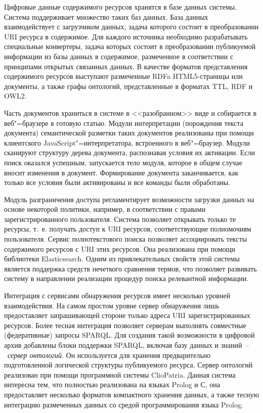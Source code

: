 \documentclass[a4paper,12pt,openany,final]{extreport}
\begin{document}
Цифровые данные содержимого ресурсов хранятся в базе данных системы.  Система поддерживает множество таких баз данных. База данных взаимодействует с загрузчиком данных, задача которого состоит в преобразовании URI ресурса в содержимое. Для каждого источника необходимо разрабатывать специальные конвертеры, задача которых состоит в преобразовании публикуемой информации из базы данных в содержимое, размеченное в соответствии с принципами открытых связанных данных. В качестве форматов представления содержимого ресурсов выступают размеченные RDFa HTML5-страницы или документы, а также графы онтологий, представленные в форматах TTL, RDF и OWL2.

Часть документов храниться в системе в <<разобранном>> виде и собирается в веб"=браузере в готовую статью. Модули интерпретации (порождения текста документа) семантической разметки таких документов реализованы при помощи клиентского JavaScript"=интерпретатора, встроенного в веб"=браузер.  Модули сканируют структуру дерева документа, распознавая условия их активации. Если поиск оказался успешным, запускается тело модуля, которое в общем случае вносит изменения в документ. Формирование документа заканчивается, как только все условия были активированы и все команды были обработаны.

Модуль разграничения доступа регламентирует возможности загрузки данных на основе некоторой политики, например, в соответствии с правами зарегистрированного пользователя. Система позволяет открывать только те ресурсы, т.~е. получать доступ к URI ресурсов, соответствующие полномочиям пользователя. Сервис полнотекстового поиска позволяет ассоциировать тексты содержимого ресурсов с URI этих ресурсов. Она реализована при помощи библиотеки Elasticsearch. Одним из привлекательных свойств этой системы является поддержка средств нечеткого сравнения термов, что позволяет развивать систему в направлении реализации процедур поиска релевантной информации.

Интеграция с сервисами обнаружения ресурсов имеет несколько уровней взаимодействия. На самом простом уровне сервер обнаружения лишь предоставляет запрашивающей стороне только адреса URI зарегистрированных ресурсов. Более тесная интеграция позволяет серверам выполнять совместные (федеративные) запросы SPARQL. Для создания такой возможности в цифровой архив добавлены блоки поддержки SPARQL, включая базу данных и знаний~--~\emph{сервер онтологий}. Он используется для хранения предварительно подготовленной логической структуры публикуемого ресурса.  Сервер онтологий реализован при помощи программной системы ClioPatria.  Данная система интересна тем, что полностью реализована на языках Prolog и С, она предоставляет несколько форматов компактного хранения данных, а также тесную интеграцию размеченных данных со средой программирования языка Prolog.
\end{document}
